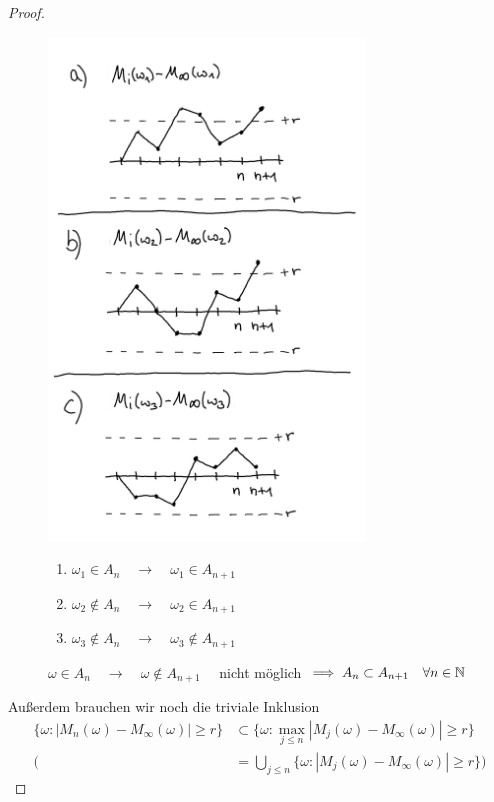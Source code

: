 \documentclass[12pt,a4paper]{article}
\begin{document}
\begin{proof}
\begin{figure}
			\includegraphics[width=0.75\textwidth]{pics/SketchUE1.png}
			\begin{enumerate}[label=Fall \alph{*})]
				\item \qquad $\omega_1 \in A_n \quad \rightarrow\quad \omega_1 \in A_{n+1}$
				\item \qquad $\omega_2 \not\in A_n \quad \rightarrow \quad \omega_2 \in A_{n+1}$
				\item \qquad $\omega_3 \not\in A_n \quad \rightarrow \quad \omega_3 \not\in A_{n+1}$
			\end{enumerate}
			$\omega \in A_n \quad \rightarrow \quad \omega \not\in A_{n+1} \quad$ nicht möglich $\implies A_n \subset A_{n+1} \quad\forall n\in\mathbb{N}$
			\label{AbbUEProzess}
	\end{figure}
	Außerdem brauchen wir noch die triviale Inklusion
	\begin{align*}
		\lbrace \omega : |M_n(\omega) - M_\infty(\omega)| \geq r\rbrace
		&\subset
		\lbrace \omega : \max\limits_{j\leq n} |M_j(\omega) - M_\infty(\omega)| \geq r\rbrace \\
		(&=\bigcup\limits_{j\leq n}\lbrace \omega : |M_j(\omega) - M_\infty(\omega)| \geq r\rbrace)

\end{align*}
\end{proof}
\end{document}
